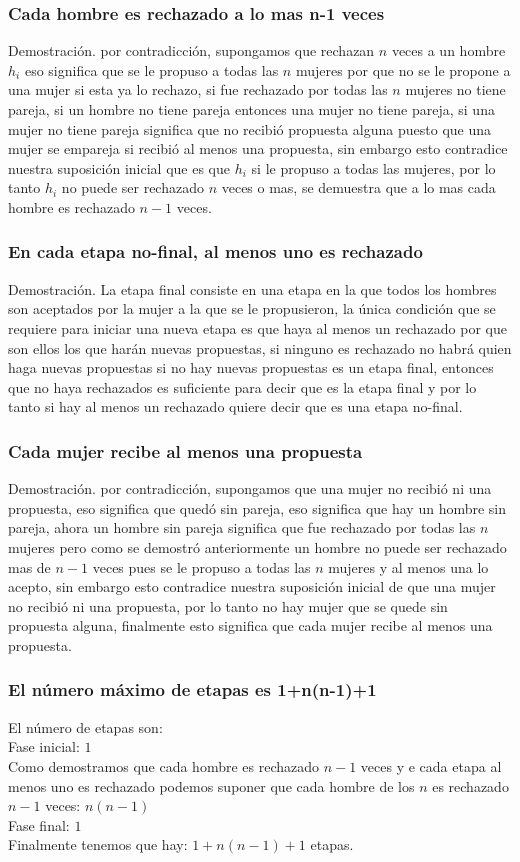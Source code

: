 \documentclass[12pt]{article}
\begin{document}
\subsubsection{Cada hombre es rechazado a lo mas n-1 veces}
Demostración. por contradicción, supongamos que rechazan $n$ veces a un hombre $h_{i}$ eso significa que se le propuso a todas las $n$ mujeres por que no se le propone a una mujer si esta ya lo rechazo, si fue rechazado por todas las $n$ mujeres no tiene pareja, si un hombre no tiene pareja entonces una mujer no tiene pareja, si una mujer no tiene pareja significa que no recibió propuesta alguna puesto que una mujer se empareja si recibió al menos una propuesta, sin embargo esto contradice nuestra suposición inicial que es que $h_{i}$ si le propuso a todas las mujeres, por lo tanto $h_{i}$ no puede ser rechazado $n$ veces o mas, se demuestra que a lo mas cada hombre es rechazado $n - 1$ veces.
\subsubsection{En cada etapa no-final, al menos uno es rechazado}
Demostración. La etapa final consiste en una etapa en la que todos los hombres son aceptados por la mujer a la que se le propusieron, la única condición que se requiere para iniciar una nueva etapa es que haya al menos un rechazado por que son ellos los que harán nuevas propuestas, si ninguno es rechazado no habrá quien haga nuevas propuestas si no hay nuevas propuestas es un etapa final, entonces que no haya rechazados es suficiente para decir que es la etapa final y por lo tanto si hay al menos un rechazado quiere decir que es una etapa no-final.
\subsubsection{Cada mujer recibe al menos una propuesta}
Demostración. por contradicción, supongamos que una mujer no recibió ni una propuesta, eso significa que quedó sin pareja, eso significa que hay un hombre sin pareja, ahora un hombre sin pareja significa que fue rechazado por todas las $n$ mujeres pero como se demostró anteriormente un hombre no puede ser rechazado mas de $n-1$ veces pues se le propuso a todas las $n$ mujeres y al menos una lo acepto, sin embargo esto contradice nuestra suposición inicial de que una mujer no recibió ni una propuesta, por lo tanto no hay mujer que se quede sin propuesta alguna, finalmente esto significa que cada mujer recibe al menos una propuesta.
\subsubsection{El número máximo de etapas es 1+n(n-1)+1}
El número de etapas son:\\
Fase inicial: $1$  \\
Como demostramos que cada hombre es rechazado $n-1$ veces y e cada etapa al menos uno es rechazado podemos suponer que cada hombre de los $n$ es rechazado $n-1$ veces: $n(n-1)$\\
Fase final: $1$\\
Finalmente tenemos que hay: $1 + n(n-1) + 1$ etapas.
\end{document}
